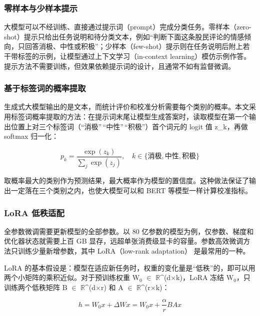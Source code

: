 \subsubsection{零样本与少样本提示}

大模型可以不经训练、直接通过提示词（prompt）完成分类任务。零样本（zero-shot）提示只给出任务说明和待分类文本，例如``判断下面这条股民评论的情感倾向，只回答消极、中性或积极''；少样本（few-shot）提示则在任务说明后附上若干带标签的示例，让模型通过上下文学习（in-context learning）模仿示例作答\cite{ref10}。提示方法不需要训练，但效果依赖提示词的设计，且通常不如有监督微调。

\subsubsection{基于标签词的概率提取}

生成式大模型输出的是文本，而统计评价和校准分析需要每个类别的概率。本文采用标签词概率提取的方法：在提示词末尾让模型生成答案时，读取模型在第一个输出位置上对三个标签词（``消极''\,``中性''\,``积极''）首个词元的 logit 值 z\_k，再做 softmax 归一化：

\begin{equation}p_k=\frac{\exp(z_k)}{\sum_j\exp(z_j)},\quad k\in\{\text{消极},\text{中性},\text{积极}\}\tag{2-5}\label{eq:2-5}\end{equation}

取概率最大的类别作为预测结果，最大概率作为模型的置信度。这种做法保证了输出一定落在三个类别之内，也使大模型可以和 BERT 等模型一样计算校准指标。

\subsubsection{LoRA 低秩适配}

全参数微调需要更新模型的全部参数。以 80 亿参数的模型为例，仅参数、梯度和优化器状态就需要上百 GB 显存，远超单张消费级显卡的容量。参数高效微调方法只训练少量新增参数，其中 LoRA（low-rank adaptation）\cite{ref14} 是最常用的一种。

LoRA 的基本假设是：模型在适应新任务时，权重的变化量是``低秩''的，即可以用两个小矩阵的乘积近似。对于预训练权重 W\(_{0}\) \(\in\) \(\mathbb{R}\)\^{}(d\(\times\)k)，LoRA 冻结 W\(_{0}\)，只训练两个低秩矩阵 B \(\in\) \(\mathbb{R}\)\^{}(d\(\times\)r) 和 A \(\in\) \(\mathbb{R}\)\^{}(r\(\times\)k)：

\begin{equation}h=W_0x+\Delta Wx=W_0x+\frac{\alpha}{r}BAx\tag{2-6}\label{eq:2-6}\end{equation}

